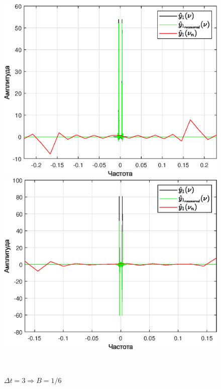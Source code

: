 \documentclass[a4paper]{article}
\begin{document}
\begin{figure}[H]
    \begin{minipage}{0.5\textwidth}
        \centering \includegraphics[width=\textwidth]{graphs2/T_50_dt_2_B_0.25_dv_0.02/func1_image.eps}
        \caption{$\Delta t = 2 \Rightarrow B = 0.25$}
    \end{minipage}\hfill
    \begin{minipage}{0.5\textwidth}
        \centering \includegraphics[width=\textwidth]{graphs2/T_50_dt_3_B_0.16667_dv_0.02/func1_image.eps}
        \caption{$\Delta t = 3 \Rightarrow B = 1/6$}
    \end{minipage}\\[1em]
\end{figure}\noindent\
\end{document}
